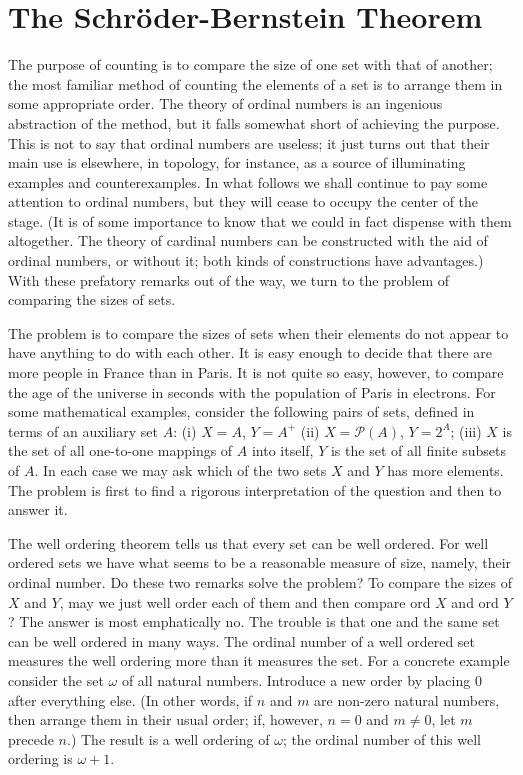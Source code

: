 
\chapter{The Schröder-Bernstein Theorem} 

The purpose of counting is to compare the size of one set with that of another; the most familiar method of counting the elements of a set is to arrange them in some appropriate order. The theory of ordinal numbers is an ingenious abstraction of the method, but it falls somewhat short of achieving the purpose. This is not to say that ordinal numbers are useless; it just turns out that their main use is elsewhere, in topology, for instance, as a source of illuminating examples and counterexamples. In what follows we shall continue to pay some attention to ordinal numbers, but they will cease to occupy the center of the stage. (It is of some importance to know that we could in fact dispense with them altogether. The theory of cardinal numbers can be constructed with the aid of ordinal numbers, or without it; both kinds of constructions have advantages.) With these prefatory remarks out of the way, we turn to the problem of comparing the sizes of sets. 

The problem is to compare the sizes of sets when their elements do not appear to have anything to do with each other. It is easy enough to decide that there are more people in France than in Paris. It is not quite so easy, however, to compare the age of the universe in seconds with the population of Paris in electrons. For some mathematical examples, consider the following pairs of sets, defined in terms of an auxiliary set $A$: (i) $X = A$, $Y = A^{+}$ (ii) $X = \mathcal{P}(A)$, $Y = 2^{A}$; (iii) $X$ is the set of all one-to-one mappings of $A$ into itself, $Y$ is the set of all finite subsets of $A$. In each case we may ask which of the two sets $X$ and $Y$ has more elements. The problem is first to find a rigorous interpretation of the question and then to answer it. 

The well ordering theorem tells us that every set can be well ordered. For well ordered sets we have what seems to be a reasonable measure of size, namely, their ordinal number. Do these two remarks solve the problem? To compare the sizes of $X$ and $Y$, may we just well order each of them and then compare ord $X$ and ord $Y$? The answer is most emphatically no. The trouble is that one and the same set can be well ordered in many ways. The ordinal number of a well ordered set measures the well ordering more than it measures the set. For a concrete example consider the set $\omega$ of all natural numbers. Introduce a new order by placing $0$ after everything else. (In other words, if $n$ and $m$ are non-zero natural numbers, then arrange them in their usual order; if, however, $n = 0$ and $m \neq 0$, let $m$ precede $n$.) The result is a well ordering of $\omega$; the ordinal number of this well ordering is $\omega + 1$.

